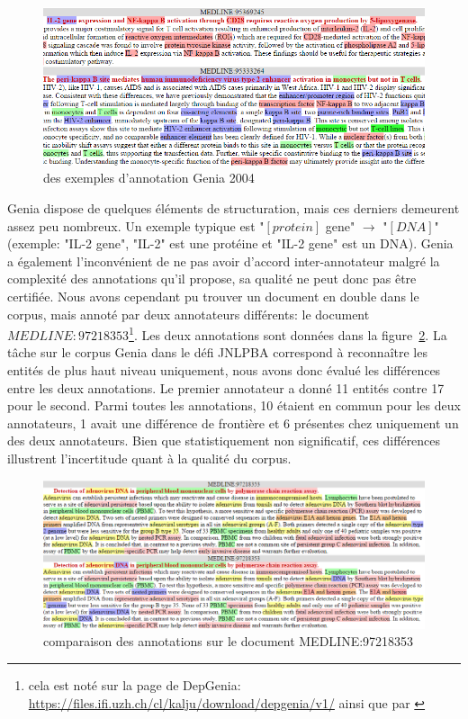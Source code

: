 \documentclass[PhD-Yoann-Dupont.tex]{subfiles}
\begin{document}
\begin{figure}[ht!]
\centering
\includegraphics[scale=0.6]{images/genia/examples}
\caption{des exemples d'annotation Genia 2004}
\label{fig:genia-examples}
\end{figure}

Genia dispose de quelques éléments de structuration, mais ces derniers demeurent assez peu nombreux. Un exemple typique est "$[protein]$ gene" $\rightarrow$ "$[DNA]$" (exemple: "IL-2 gene", "IL-2" est une protéine et "IL-2 gene" est un DNA). Genia a également l'inconvénient de ne pas avoir d'accord inter-annotateur malgré la complexité des annotations qu'il propose, sa qualité ne peut donc pas être certifiée. Nous avons cependant pu trouver un document en double dans le corpus, mais annoté par deux annotateurs différents: le document $MEDLINE:97218353$\footnote{cela est noté sur la page de DepGenia: \url{https://files.ifi.uzh.ch/cl/kalju/download/depgenia/v1/} ainsi que par \citet{lease2005parsing}}. Les deux annotations sont données dans la figure\ \ref{fig:genia-medline-97218353}. La tâche sur le corpus Genia dans le défi JNLPBA correspond à reconnaître les entités de plus haut niveau uniquement, nous avons donc évalué les différences entre les deux annotations. Le premier annotateur a donné 11 entités contre 17 pour le second. Parmi toutes les annotations, 10 étaient en commun pour les deux annotateurs, 1 avait une différence de frontière et 6 présentes chez uniquement un des deux annotateurs. Bien que statistiquement non significatif, ces différences illustrent l'incertitude quant à la qualité du corpus.

\begin{figure}[ht!]
\centering
\includegraphics[scale=0.5]{images/genia/MEDLINE-97218353}
\caption{comparaison des annotations sur le document MEDLINE:97218353}
\label{fig:genia-medline-97218353}
\end{figure}
\end{document}

